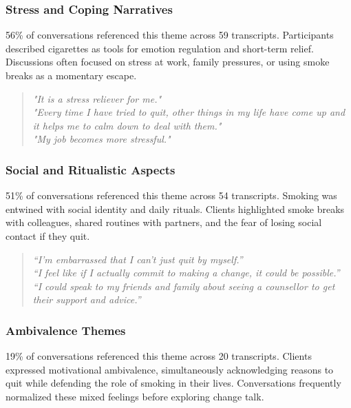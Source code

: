 \subsubsection{Stress and Coping Narratives}

56\% of conversations referenced this theme across 59 transcripts.
Participants described cigarettes as tools for emotion regulation and short-term relief. Discussions often focused on stress at work, family pressures, or using smoke breaks as a momentary escape.

\begin{quote}
\emph{"It is a stress reliever for me."} \\
\emph{"Every time I have tried to quit, other things in my life have come up and it helps me to calm down to deal with them."} \\
\emph{"My job becomes more stressful."}
\end{quote}

\subsubsection{Social and Ritualistic Aspects}

51\% of conversations referenced this theme across 54 transcripts.
Smoking was entwined with social identity and daily rituals. Clients highlighted smoke breaks with colleagues, shared routines with partners, and the fear of losing social contact if they quit.

\begin{quote}
\emph{``I'm embarrassed that I can't just quit by myself.''} \\
\emph{``I feel like if I actually commit to making a change, it could be possible.''} \\
\emph{``I could speak to my friends and family about seeing a counsellor to get their support and advice.''}
\end{quote}

\subsubsection{Ambivalence Themes}

19\% of conversations referenced this theme across 20 transcripts.
Clients expressed motivational ambivalence, simultaneously acknowledging reasons to quit while defending the role of smoking in their lives. Conversations frequently normalized these mixed feelings before exploring change talk.

